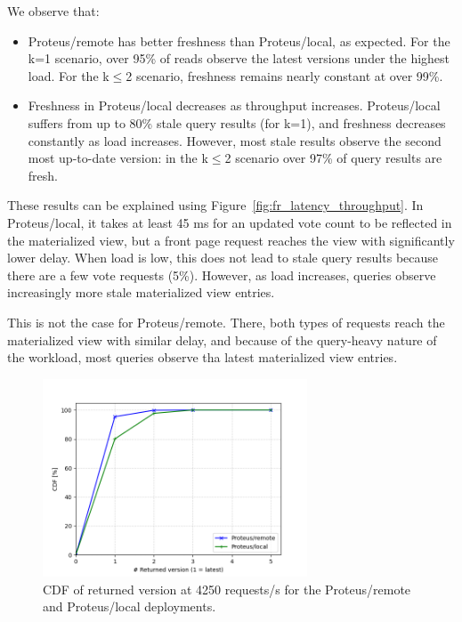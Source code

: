 We observe that:
\begin{itemize}
  \item Proteus/remote has better freshness than Proteus/local, as expected.
  For the k=1 scenario, over 95\% of reads observe the latest versions under the highest load.
  For the k$\leq$2 scenario, freshness remains nearly constant at over 99\%.
  \item Freshness in Proteus/local decreases as throughput increases.
  Proteus/local suffers from up to 80\% stale query results (for k=1), and freshness decreases constantly as load increases.
  However, most stale results observe the second most up-to-date version:
  in the k$\leq$2 scenario over 97\% of query results are fresh.
\end{itemize}

These results can be explained using Figure~\ref{fig:fr_latency_throughput}.
In Proteus/local, it takes at least 45 ms for an updated vote count to be reflected in the materialized view,
but a front page request reaches the view with significantly lower delay.
When load is low, this does not lead to stale query results because there are a few vote requests (5\%).
However, as load increases, queries observe increasingly more stale materialized view  entries.

This is not the case for Proteus/remote.
There, both types of requests reach the materialized view with similar delay,
and because of the query-heavy nature of the workload,
most queries observe tha latest materialized view entries.

\begin{figure}[H]
\centering
  \includegraphics[width=0.7\textwidth]{./figures/evaluation/readV_cdf_throughput.png}
  \caption{CDF of returned version at 4250 requests/s for the Proteus/remote and Proteus/local deployments.}
  \label{fig:readV_cdf_throughput}
\end{figure}

